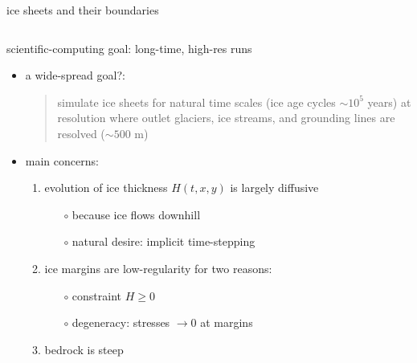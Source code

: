 \documentclass[hide notes,intlimits,usenames,dvipsnames]{beamer}
\begin{document}
\begin{frame}{ice sheets and their boundaries}
\begin{columns}
\begin{column}{0.6\textwidth}
\end{column}
\end{columns}
\end{frame}


\begin{frame}{scientific-computing goal: long-time, high-res runs}

\begin{itemize}
\item a wide-spread goal?:
\begin{quote}
simulate ice sheets for natural time scales (ice age cycles \alert{$\sim 10^5$ years}) at resolution where outlet glaciers, ice streams, and grounding lines are resolved (\alert{$\sim 500$ m})
\end{quote}
\item main concerns:
    \begin{enumerate}
    \item evolution of ice thickness $H(t,x,y)$ is largely diffusive
        \begin{itemize}
        \item[$\circ$] because ice flows downhill
        \item[$\circ$] natural desire: implicit time-stepping
        \end{itemize}
    \item ice margins are low-regularity for two reasons:
        \begin{itemize}
        \item[$\circ$] constraint $H\ge 0$
        \item[$\circ$] degeneracy: stresses $\to 0$ at margins
        \end{itemize}
    \item bedrock is steep
    \end{enumerate}
\end{itemize}
\end{frame}
\end{document}
